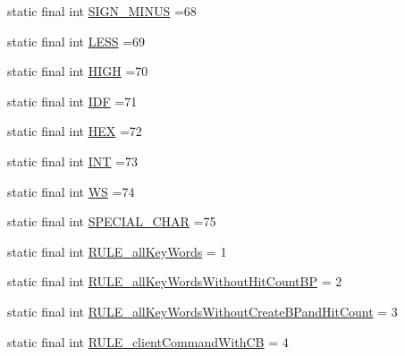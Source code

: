 \begin{DoxyCompactItemize}
\item 
static final int \hyperlink{classgov_1_1nasa_1_1jpf_1_1inspector_1_1client_1_1parser_1_1_console_grammar_parser_a48b3f6921fee5d663dafe240074dac66}{S\+I\+G\+N\+\_\+\+M\+I\+N\+US} =68
\item 
static final int \hyperlink{classgov_1_1nasa_1_1jpf_1_1inspector_1_1client_1_1parser_1_1_console_grammar_parser_ac325745c393b7e613626f2c93e95e486}{L\+E\+SS} =69
\item 
static final int \hyperlink{classgov_1_1nasa_1_1jpf_1_1inspector_1_1client_1_1parser_1_1_console_grammar_parser_a49ebb9abbff306598870ca6253d0fc4f}{H\+I\+GH} =70
\item 
static final int \hyperlink{classgov_1_1nasa_1_1jpf_1_1inspector_1_1client_1_1parser_1_1_console_grammar_parser_ae9d41d0f0abda3e06c7f452164d2e3a0}{I\+DF} =71
\item 
static final int \hyperlink{classgov_1_1nasa_1_1jpf_1_1inspector_1_1client_1_1parser_1_1_console_grammar_parser_a760e1cd3b643e8ee8af5d134b5d438c6}{H\+EX} =72
\item 
static final int \hyperlink{classgov_1_1nasa_1_1jpf_1_1inspector_1_1client_1_1parser_1_1_console_grammar_parser_abd77a1befc3eca91ef4ffb5856126df5}{I\+NT} =73
\item 
static final int \hyperlink{classgov_1_1nasa_1_1jpf_1_1inspector_1_1client_1_1parser_1_1_console_grammar_parser_a6914a3a3adbc350b12a7df9d1b24abf1}{WS} =74
\item 
static final int \hyperlink{classgov_1_1nasa_1_1jpf_1_1inspector_1_1client_1_1parser_1_1_console_grammar_parser_a978bd8334dd75839036a09d94b04280f}{S\+P\+E\+C\+I\+A\+L\+\_\+\+C\+H\+AR} =75
\item 
static final int \hyperlink{classgov_1_1nasa_1_1jpf_1_1inspector_1_1client_1_1parser_1_1_console_grammar_parser_affcebe0bdc4fd98308343e628a3ee558}{R\+U\+L\+E\+\_\+all\+Key\+Words} = 1
\item 
static final int \hyperlink{classgov_1_1nasa_1_1jpf_1_1inspector_1_1client_1_1parser_1_1_console_grammar_parser_a10bfdd9072c136c09b0772579e0ad32b}{R\+U\+L\+E\+\_\+all\+Key\+Words\+Without\+Hit\+Count\+BP} = 2
\item 
static final int \hyperlink{classgov_1_1nasa_1_1jpf_1_1inspector_1_1client_1_1parser_1_1_console_grammar_parser_a827b1d63eb4334c45ec1081d87d90298}{R\+U\+L\+E\+\_\+all\+Key\+Words\+Without\+Create\+B\+Pand\+Hit\+Count} = 3
\item 
static final int \hyperlink{classgov_1_1nasa_1_1jpf_1_1inspector_1_1client_1_1parser_1_1_console_grammar_parser_aed1ac3912f490b8fe2045683854f5d7a}{R\+U\+L\+E\+\_\+client\+Command\+With\+CB} = 4

\end{DoxyCompactItemize}
